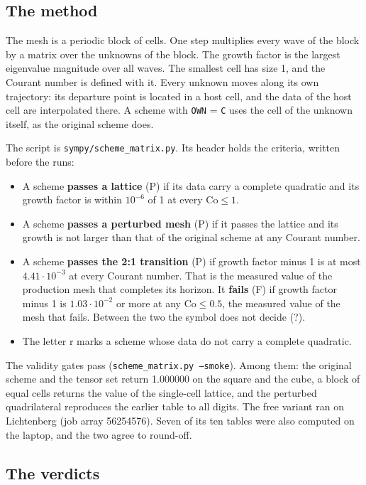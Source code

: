 \documentclass[11pt,a4paper]{article}
\begin{document}
\subsection{The method}

The mesh is a periodic block of cells. One step multiplies every wave of the block by a
matrix over the unknowns of the block. The growth factor is the largest eigenvalue
magnitude over all waves. The smallest cell has size 1, and the Courant number is defined
with it. Every unknown moves along its own trajectory: its departure point is located in
a host cell, and the data of the host cell are interpolated there. A scheme with
\texttt{OWN} = \texttt{C} uses the cell of the unknown itself, as the original scheme does.

The script is \texttt{sympy/scheme\_matrix.py}. Its header holds the criteria, written
before the runs:
\begin{itemize}
  \item A scheme \textbf{passes a lattice} (P) if its data carry a complete quadratic and
        its growth factor is within $10^{-6}$ of 1 at every $\mathrm{Co} \le 1$.
  \item A scheme \textbf{passes a perturbed mesh} (P) if it passes the lattice and its
        growth is not larger than that of the original scheme at any Courant number.
  \item A scheme \textbf{passes the 2:1 transition} (P) if growth factor minus 1 is at most
        $4.41\cdot10^{-3}$ at every Courant number. That is the measured value of the
        production mesh that completes its horizon. It \textbf{fails} (F) if growth factor
        minus 1 is $1.03\cdot10^{-2}$ or more at any $\mathrm{Co} \le 0.5$, the measured
        value of the mesh that fails. Between the two the symbol does not decide (?).
  \item The letter r marks a scheme whose data do not carry a complete quadratic.
\end{itemize}
The validity gates pass (\texttt{scheme\_matrix.py --smoke}). Among them: the original
scheme and the tensor set return 1.000000 on the square and the cube, a block of equal
cells returns the value of the single-cell lattice, and the perturbed quadrilateral
reproduces the earlier table to all digits. The free variant ran on Lichtenberg (job
array 56254576). Seven of its ten tables were also computed on the laptop, and the two
agree to round-off.

\subsection{The verdicts}
\end{document}
